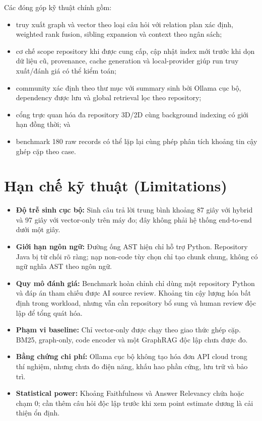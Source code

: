 \documentclass[12pt,a4paper,oneside]{report}
\begin{document}
Các đóng góp kỹ thuật chính gồm:
\begin{itemize}
    \item truy xuất graph và vector theo loại câu hỏi với relation plan xác định, weighted rank fusion, sibling expansion và context theo ngân sách;
    \item cơ chế scope repository khi được cung cấp, cập nhật index mới trước khi dọn dữ liệu cũ, provenance, cache generation và local-provider giúp run truy xuất/đánh giá có thể kiểm toán;
    \item community xác định theo thư mục với summary sinh bởi Ollama cục bộ, dependency được lưu và global retrieval lọc theo repository;
    \item cổng trực quan hóa đa repository 3D/2D cùng background indexing có giới hạn đồng thời; và
    \item benchmark 180 raw records có thể lặp lại cùng phép phân tích khoảng tin cậy ghép cặp theo case.
\end{itemize}

\section{Hạn chế kỹ thuật (Limitations)}
\label{sec:limitations}
\begin{itemize}
    \item \textbf{Độ trễ sinh cục bộ:} Sinh câu trả lời trung bình khoảng 87 giây với hybrid và 97 giây với vector-only trên máy đo; đây không phải hệ thống end-to-end dưới một giây.
    \item \textbf{Giới hạn ngôn ngữ:} Đường ống AST hiện chỉ hỗ trợ Python. Repository Java bị từ chối rõ ràng; nạp non-code tùy chọn chỉ tạo chunk chung, không có ngữ nghĩa AST theo ngôn ngữ.
    \item \textbf{Quy mô đánh giá:} Benchmark hoàn chỉnh chỉ dùng một repository Python và đáp án tham chiếu được AI source review. Khoảng tin cậy lượng hóa bất định trong workload, nhưng vẫn cần repository bổ sung và human review độc lập để tổng quát hóa.
    \item \textbf{Phạm vi baseline:} Chỉ vector-only được chạy theo giao thức ghép cặp. BM25, graph-only, code encoder và một GraphRAG độc lập chưa được đo.
    \item \textbf{Bằng chứng chi phí:} Ollama cục bộ không tạo hóa đơn API cloud trong thí nghiệm, nhưng chưa đo điện năng, khấu hao phần cứng, lưu trữ và bảo trì.
    \item \textbf{Statistical power:} Khoảng Faithfulness và Answer Relevancy chứa hoặc chạm 0; cần thêm câu hỏi độc lập trước khi xem point estimate dương là cải thiện ổn định.
\end{itemize}
\end{document}
